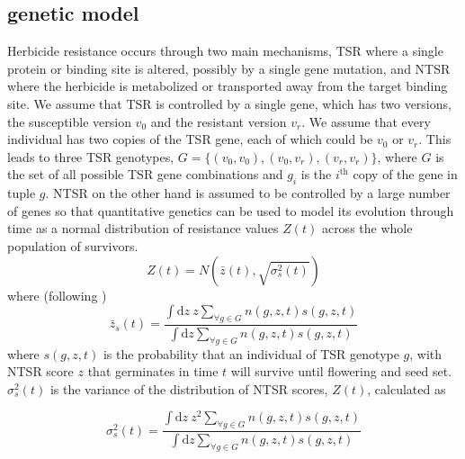 \documentclass[12pt, a4paper]{article}
\begin{document}
\subsection{genetic model}
Herbicide resistance occurs through two main mechanisms, TSR where a single protein or binding site is altered, possibly by a single gene mutation, and NTSR  where the herbicide is metabolized or transported away from the target binding site. We assume that TSR is controlled by a single gene, which has two versions, the susceptible version $v_0$ and the resistant version $v_r$. We assume that every individual has two copies of the TSR gene, each of which could be $v_0$ or $v_r$. This leads to three TSR genotypes, $G = \{(v_0, v_0), (v_0, v_r), (v_r, v_r)\}$, where $G$ is the set of all possible TSR gene combinations and $g_i$ is the $i^\text{th}$ copy of the gene in tuple $g$. NTSR on the other hand is assumed to be controlled by a large number of genes so that quantitative genetics can be used to model its evolution through time as a normal distribution of resistance values $Z(t)$ across the whole population of survivors. 
\begin{equation}\label{eq:MR_dist}
	Z(t) = N(\bar{z}(t),\sqrt{\sigma_s^2(t)})
\end{equation}
where (following \cite{Coul2010})
\begin{equation}\label{eq:MR_mean}
	\bar{z}_s(t) = \frac{\int \text{d}z~z\displaystyle\sum_{\forall g \in G}n(g, z, t)s(g, z, t)}{\int \text{d}z\displaystyle\sum_{\forall g \in G}n(g, z, t)s(g, z, t)}
\end{equation}
where $s(g, z, t)$ is the probability that an individual of TSR genotype $g$, with NTSR score $z$ that germinates in time $t$ will survive until flowering and seed set. $\sigma_s^2(t)$ is the variance of the distribution of NTSR scores, $Z(t)$, calculated as 
    
\begin{equation}\label{eq:MR_sd}
	\sigma_s^2(t) = \frac{\int \text{d}z~z^2\displaystyle\sum_{\forall g \in G}n(g, z, t)s(g, z, t)}{\int \text{d}z\displaystyle\sum_{\forall g \in G}n(g, z, t)s(g, z, t)}
\end{equation}
\end{document}
